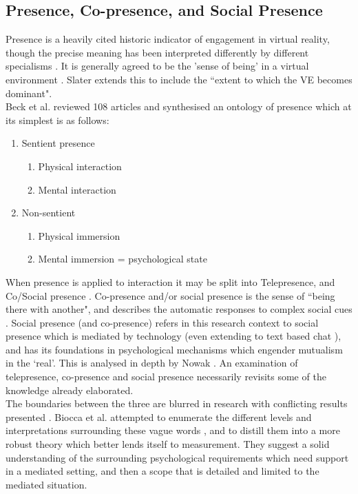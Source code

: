 \subsection{Presence, Co-presence, and Social Presence}
Presence is a heavily cited historic indicator of engagement in virtual reality, though the precise meaning has been interpreted differently by different specialisms \cite{Beck2011, Schuemie2001}. It is generally agreed to be the 'sense of being' in a virtual environment \cite{Slater1999}. Slater extends this to include the ``extent to which the VE becomes dominant". \\
Beck et al. reviewed 108 articles and synthesised an ontology of presence \cite{Beck2011} which at its simplest is as follows:
            \begin{enumerate}
				\item Sentient presence
                    \begin{enumerate}
                     \item Physical interaction
                      \item Mental interaction
                    \end{enumerate}
                   \item Non-sentient
                   \begin{enumerate}
                       \item Physical immersion
                       \item Mental immersion = psychological state
                     \end{enumerate}
            \end{enumerate}
When presence is applied to interaction it may be split into Telepresence, and Co/Social presence  \cite{heeter1992being, Biocca1997}.  Co-presence and/or social presence is the sense of ``being there with another", and describes the automatic responses to complex social cues \cite{doi:10.1080/01449299508914633, fulk1987social, haythornthwaite1995work}.    Social presence (and co-presence) refers in this research context to social presence which is mediated by technology (even extending to text based chat \cite{Gunawardena1997}), and has its foundations in psychological mechanisms which engender mutualism in the `real'. This is analysed in depth by Nowak \cite{Nowak2001}. An examination of telepresence, co-presence and social presence necessarily revisits some of the knowledge already elaborated.\\
        The boundaries between the three are blurred in research with conflicting results presented \cite{Bulu2012}. Biocca et al. attempted to enumerate the different levels and interpretations surrounding these vague words \cite{Biocca2003}, and to distill them into a more robust theory which better lends itself to measurement. They suggest a solid understanding of the surrounding psychological requirements which need support in a mediated setting, and then a scope that is detailed and limited to the mediated situation.\\
